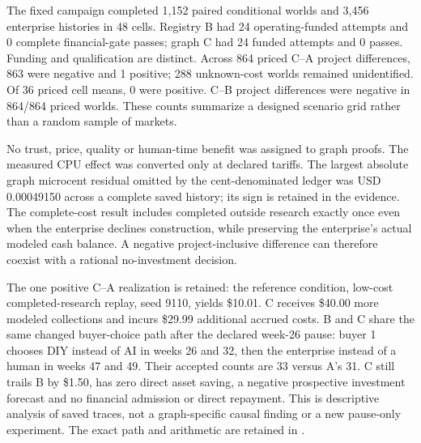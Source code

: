 
The fixed campaign completed 1,152 paired conditional worlds and 3,456 enterprise histories in 48 cells. Registry B had 24 operating-funded attempts and 0 complete financial-gate passes; graph C had 24 funded attempts and 0 passes. Funding and qualification are distinct. Across 864 priced C--A project differences, 863 were negative and 1 positive; 288 unknown-cost worlds remained unidentified. Of 36 priced cell means, 0 were positive. C--B project differences were negative in 864/864 priced worlds. These counts summarize a designed scenario grid rather than a random sample of markets.

No trust, price, quality or human-time benefit was assigned to graph proofs. The measured CPU effect was converted only at declared tariffs. The largest absolute graph microcent residual omitted by the cent-denominated ledger was USD 0.00049150 across a complete saved history; its sign is retained in the evidence. The complete-cost result includes completed outside research exactly once even when the enterprise declines construction, while preserving the enterprise's actual modeled cash balance. A negative project-inclusive difference can therefore coexist with a rational no-investment decision.


The one positive C--A realization is retained: the reference condition, low-cost completed-research replay, seed 9110, yields \$10.01. C receives \$40.00 more modeled collections and incurs \$29.99 additional accrued costs. B and C share the same changed buyer-choice path after the declared week-26 pause: buyer 1 chooses DIY instead of AI in weeks 26 and 32, then the enterprise instead of a human in weeks 47 and 49. Their accepted counts are 33 versus A's 31. C still trails B by \$1.50, has zero direct asset saving, a negative prospective investment forecast and no financial admission or direct repayment. This is descriptive analysis of saved traces, not a graph-specific causal finding or a new pause-only experiment. The exact path and arithmetic are retained in .

